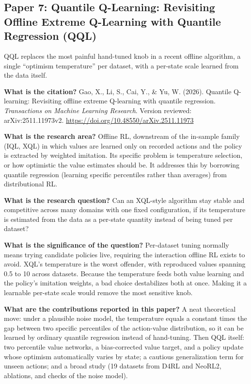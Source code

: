 \documentclass[11pt]{article}
\newcommand{\paper}[1]{\subsection*{#1}}
\newcommand{\q}[2]{\item \textbf{#1} #2}
\begin{document}
\paper{Paper 7: Quantile Q-Learning: Revisiting Offline Extreme Q-Learning with Quantile Regression (QQL)}
QQL replaces the most painful hand-tuned knob in a recent offline algorithm, a single ``optimism temperature'' per dataset, with a per-state scale learned from the data itself.
\begin{qna}

\q{What is the citation?}
Gao, X., Li, S., Cai, Y., \& Yu, W. (2026). Quantile Q-learning: Revisiting offline extreme Q-learning with quantile regression. \emph{Transactions on Machine Learning Research}. Version reviewed: arXiv:2511.11973v2. \url{https://doi.org/10.48550/arXiv.2511.11973}

\q{What is the research area?}
Offline RL, downstream of the in-sample family (IQL, XQL) in which values are learned only on recorded actions and the policy is extracted by weighted imitation. Its specific problem is temperature selection, or how optimistic the value estimates should be. It addresses this by borrowing quantile regression (learning specific percentiles rather than averages) from distributional RL.

\q{What is the research question?}
Can an XQL-style algorithm stay stable and competitive across many domains with one fixed configuration, if its temperature is estimated from the data as a per-state quantity instead of being tuned per dataset?

\q{What is the significance of the question?}
Per-dataset tuning normally means trying candidate policies live, requiring the interaction offline RL exists to avoid. XQL's temperature is the worst offender, with reproduced values spanning 0.5 to 10 across datasets. Because the temperature feeds both value learning and the policy's imitation weights, a bad choice destabilizes both at once. Making it a learnable per-state scale would remove the most sensitive knob.

\q{What are the contributions reported in this paper?}
A neat theoretical move: under a plausible noise model, the temperature equals a constant times the gap between two specific percentiles of the action-value distribution, so it can be learned by ordinary quantile regression instead of hand-tuning. Then QQL itself: two percentile value networks, a bias-corrected value target, and a policy update whose optimism automatically varies by state; a cautious generalization term for unseen actions; and a broad study (19 datasets from D4RL and NeoRL2, ablations, and checks of the noise model).


\end{qna}
\end{document}
